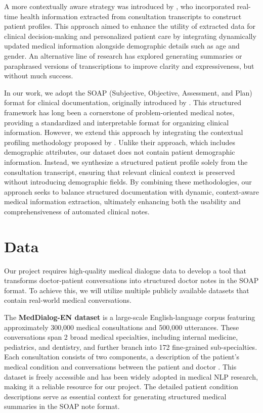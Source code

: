 \documentclass[11pt,a4paper]{article}
\begin{document}
A more contextually aware strategy was introduced by \cite{contextagg}, who incorporated real-time health information extracted from consultation transcripts to construct patient profiles. This approach aimed to enhance the utility of extracted data for clinical decision-making and personalized patient care by integrating dynamically updated medical information alongside demographic details such as age and gender. An alternative line of research has explored generating summaries or paraphrased versions of transcriptions to improve clarity and expressiveness, but without much success.

In our work, we adopt the SOAP (Subjective, Objective, Assessment, and Plan) format for clinical documentation, originally introduced by \cite{SOAP}. This structured framework has long been a cornerstone of problem-oriented medical notes, providing a standardized and interpretable format for organizing clinical information. However, we extend this approach by integrating the contextual profiling methodology proposed by \cite{contextagg}. Unlike their approach, which includes demographic attributes, our dataset does not contain patient demographic information. Instead, we synthesize a structured patient profile solely from the consultation transcript, ensuring that relevant clinical context is preserved without introducing demographic fields. By combining these methodologies, our approach seeks to balance structured documentation with dynamic, context-aware medical information extraction, ultimately enhancing both the usability and comprehensiveness of automated clinical notes.
\section{Data}

Our project requires high-quality medical dialogue data to develop a tool that transforms doctor-patient conversations into structured doctor notes in the SOAP format. To achieve this, we will utilize multiple publicly available datasets that contain real-world medical conversations.

The \textbf{MedDialog-EN dataset} is a large-scale English-language corpus featuring approximately 300,000 medical consultations and 500,000 utterances. These conversations span 2 broad medical specialties, including internal medicine, pediatrics, and dentistry, and further branch into 172 fine-grained sub-specialties. Each consultation consists of two components, a description of the patient's medical condition and conversations between the patient and doctor \cite{zeng-etal-2020-meddialog}.
This dataset is freely accessible and has been widely adopted in medical NLP research, making it a reliable resource for our project. The detailed patient condition descriptions serve as essential context for generating structured medical summaries in the SOAP note format. 
\end{document}
